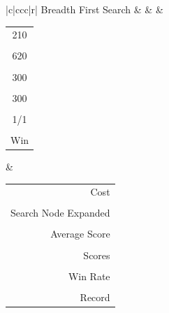 \documentclass[
10pt, %
a4paper, %
oneside, %
headinclude,footinclude, %
BCOR5mm, %
]{scrartcl}
\begin{document}
\begin{table}[]
{\begin{tabular}{|c|ccc|r|}
			Breadth First Search                                                   &     &        & \begin{tabular}[c]{@{}c@{}}210\\ \\ 620\\ \\ 300\\ \\ 300\\ \\ 1/1\\ \\ Win\end{tabular} & \begin{tabular}[c]{@{}r@{}}Cost\\   \\ Search Node Expanded\\  \\ Average Score\\  \\ Scores\\  \\ Win Rate\\  \\ Record\end{tabular} \\ \hline

\end{tabular}}
\end{table}
\end{document}
